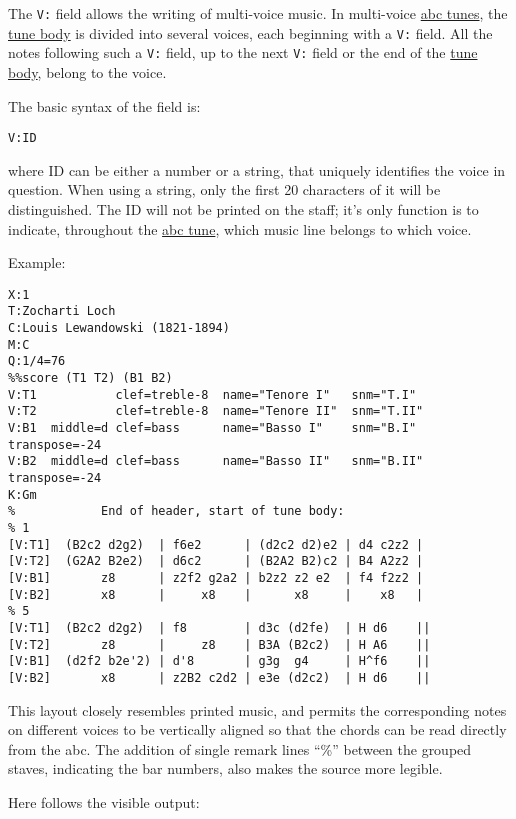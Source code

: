 The \texttt{V:} field allows the writing of multi-voice music. In
multi-voice \protect\hyperlink{abc_tune_definition}{abc tunes}, the
\protect\hyperlink{tune_body_definition}{tune body} is divided into
several voices, each beginning with a \texttt{V:} field. All the notes
following such a \texttt{V:} field, up to the next \texttt{V:} field or
the end of the \protect\hyperlink{tune_body_definition}{tune body},
belong to the voice.

The basic syntax of the field is:

\begin{verbatim}
V:ID
\end{verbatim}

where ID can be either a number or a string, that uniquely identifies
the voice in question. When using a string, only the first 20 characters
of it will be distinguished. The ID will not be printed on the staff;
it's only function is to indicate, throughout the
\protect\hyperlink{abc_tune_definition}{abc tune}, which music line
belongs to which voice.

Example:

\begin{verbatim}
X:1
T:Zocharti Loch
C:Louis Lewandowski (1821-1894)
M:C
Q:1/4=76
%%score (T1 T2) (B1 B2)
V:T1           clef=treble-8  name="Tenore I"   snm="T.I"
V:T2           clef=treble-8  name="Tenore II"  snm="T.II"
V:B1  middle=d clef=bass      name="Basso I"    snm="B.I"  transpose=-24
V:B2  middle=d clef=bass      name="Basso II"   snm="B.II" transpose=-24
K:Gm
%            End of header, start of tune body:
% 1
[V:T1]  (B2c2 d2g2)  | f6e2      | (d2c2 d2)e2 | d4 c2z2 |
[V:T2]  (G2A2 B2e2)  | d6c2      | (B2A2 B2)c2 | B4 A2z2 |
[V:B1]       z8      | z2f2 g2a2 | b2z2 z2 e2  | f4 f2z2 |
[V:B2]       x8      |     x8    |      x8     |    x8   |
% 5
[V:T1]  (B2c2 d2g2)  | f8        | d3c (d2fe)  | H d6    ||
[V:T2]       z8      |     z8    | B3A (B2c2)  | H A6    ||
[V:B1]  (d2f2 b2e'2) | d'8       | g3g  g4     | H^f6    ||
[V:B2]       x8      | z2B2 c2d2 | e3e (d2c2)  | H d6    ||
\end{verbatim}

This layout closely resembles printed music, and permits the
corresponding notes on different voices to be vertically aligned so that
the chords can be read directly from the abc. The addition of single
remark lines ``\%'' between the grouped staves, indicating the bar
numbers, also makes the source more legible.

Here follows the visible output:

